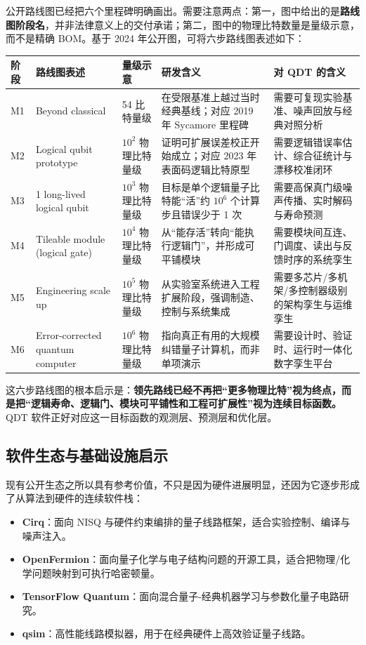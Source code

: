 \documentclass[11pt,a4paper]{article}
\newcommand{\QDT}{QDT}
\begin{document}
公开路线图已经把六个里程碑明确画出。需要注意两点：第一，图中给出的是\textbf{路线图阶段名}，并非法律意义上的交付承诺；第二，图中的物理比特数量是量级示意，而不是精确 BOM。基于 2024 年公开图，可将六步路线图表述如下：

{\footnotesize
\begin{longtable}{L{1.1cm}L{2.7cm}L{2.0cm}L{3.4cm}L{5.1cm}}
\toprule
阶段 & 路线图表述 & 量级示意 & 研发含义 & 对 \QDT{} 的含义 \\
\midrule
\endhead
M1 & Beyond classical & 54 比特量级 & 在受限基准上越过当时经典基线；对应 2019 年 Sycamore 里程碑 & 需要可复现实验基准、噪声回放与经典对照分析 \\
M2 & Logical qubit prototype & $10^2$ 物理比特量级 & 证明可扩展误差校正开始成立；对应 2023 年表面码逻辑比特原型 & 需要逻辑错误率估计、综合征统计与漂移校准闭环 \\
M3 & 1 long-lived logical qubit & $10^3$ 物理比特量级 & 目标是单个逻辑量子比特能“活”约 $10^6$ 个计算步且错误少于 1 次 & 需要高保真门级噪声传播、实时解码与寿命预测 \\
M4 & Tileable module (logical gate) & $10^4$ 物理比特量级 & 从“能存活”转向“能执行逻辑门”，并形成可平铺模块 & 需要模块间互连、门调度、读出与反馈时序的系统孪生 \\
M5 & Engineering scale up & $10^5$ 物理比特量级 & 从实验室系统进入工程扩展阶段，强调制造、控制与系统集成 & 需要多芯片/多机架/多控制器级别的架构孪生与运维孪生 \\
M6 & Error-corrected quantum computer & $10^6$ 物理比特量级 & 指向真正有用的大规模纠错量子计算机，而非单项演示 & 需要设计时、验证时、运行时一体化数字孪生平台 \\
\bottomrule
\end{longtable}
}

这六步路线图的根本启示是：\textbf{领先路线已经不再把“更多物理比特”视为终点，而是把“逻辑寿命、逻辑门、模块可平铺性和工程可扩展性”视为连续目标函数。} \QDT{} 软件正好对应这一目标函数的观测层、预测层和优化层。

\subsection{软件生态与基础设施启示}

现有公开生态之所以具有参考价值，不只是因为硬件进展明显，还因为它逐步形成了从算法到硬件的连续软件栈：

\begin{itemize}
  \item \textbf{Cirq}：面向 NISQ 与硬件约束编排的量子线路框架，适合实验控制、编译与噪声注入。
  \item \textbf{OpenFermion}：面向量子化学与电子结构问题的开源工具，适合把物理/化学问题映射到可执行哈密顿量。
  \item \textbf{TensorFlow Quantum}：面向混合量子-经典机器学习与参数化量子电路研究。
  \item \textbf{qsim}：高性能线路模拟器，用于在经典硬件上高效验证量子线路。
\end{itemize}
\end{document}
